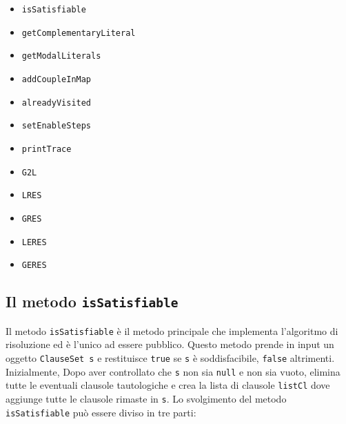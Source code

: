 \documentclass[a4paper,12pt]{report}
\begin{document}
\begin{center}
    \begin{minipage}{0.45\textwidth}
        \begin{itemize}
            \item \texttt{isSatisfiable}
            \item \texttt{getComplementaryLiteral}
            \item \texttt{getModalLiterals}
            \item \texttt{addCoupleInMap}
            \item \texttt{alreadyVisited}
            \item \texttt{setEnableSteps}
            \item \texttt{printTrace}
        \end{itemize}
    \end{minipage}
    \hspace{0.05\textwidth}
    \begin{minipage}{0.45\textwidth}
        \begin{itemize}
            \item \texttt{G2L}
            \item \texttt{LRES}
            \item \texttt{GRES}
            \item \texttt{LERES}
            \item \texttt{GERES}
        \end{itemize}
    \end{minipage}
\end{center}


\subsection*{Il metodo \texttt{isSatisfiable}}
Il metodo \texttt{isSatisfiable} è il metodo principale che implementa l'algoritmo di risoluzione ed è l'unico ad essere pubblico. Questo metodo prende in input un oggetto \texttt{ClauseSet s} e restituisce \texttt{true} se \texttt{s} è soddisfacibile, \texttt{false} altrimenti. Inizialmente, Dopo aver controllato che \texttt{s} non sia \texttt{null} e non sia vuoto, elimina tutte le eventuali clausole tautologiche e crea la lista di clausole \texttt{listCl} dove aggiunge tutte le clausole rimaste in \texttt{s}. Lo svolgimento del metodo \texttt{isSatisfiable} può essere diviso in tre parti:
\end{document}
